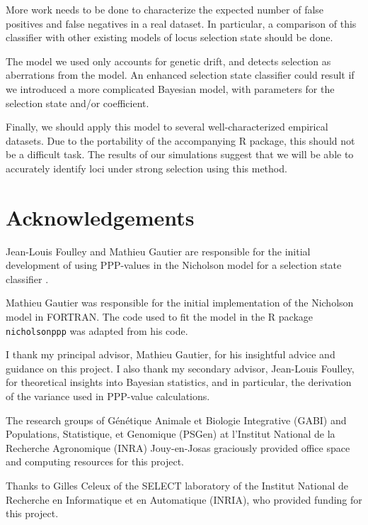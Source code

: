 \documentclass[a4paper,12pt]{article}
\begin{document}
More work needs to be done to characterize the expected number of
false positives and false negatives in a real dataset. In particular,
a comparison of this classifier with other existing models of locus
selection state should be done.

The model we used only accounts for genetic drift, and detects
selection as aberrations from the model. An enhanced selection state
classifier could result if we introduced a more complicated Bayesian
model, with parameters for the selection state and/or coefficient.

Finally, we should apply this model to several well-characterized
empirical datasets. Due to the portability of the accompanying R
package, this should not be a difficult task. The results of our
simulations suggest that we will be able to accurately identify loci
under strong selection using this method.

\section{Acknowledgements}

Jean-Louis Foulley and Mathieu Gautier are responsible for the initial
development of using PPP-values in the Nicholson model for a selection
state classifier \cite{foulley-gautier}.

Mathieu Gautier was responsible for the initial implementation of the
Nicholson model in FORTRAN. The code used to fit the model in the R
package \texttt{nicholsonppp} was adapted from his code.

I thank my principal advisor, Mathieu Gautier, for his insightful
advice and guidance on this project. I also thank my secondary
advisor, Jean-Louis Foulley, for theoretical insights into Bayesian
statistics, and in particular, the derivation of the variance used in
PPP-value calculations.

The research groups of G\'en\'etique Animale et Biologie Integrative
(GABI) and Populations, Statistique, et Genomique (PSGen) at
l'Institut National de la Recherche Agronomique (INRA) Jouy-en-Josas
graciously provided office space and computing resources for this
project.

Thanks to Gilles Celeux of the SELECT laboratory of the Institut
National de Recherche en Informatique et en Automatique (INRIA), who
provided funding for this project.



\end{document}
